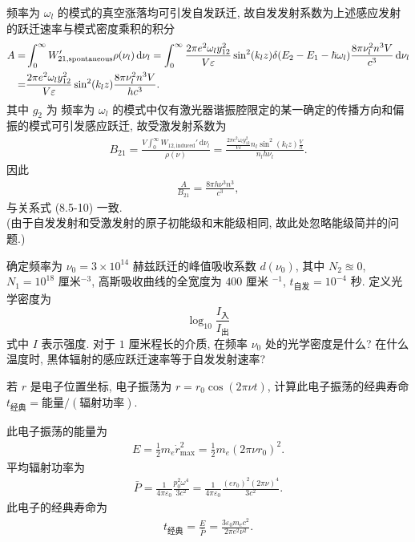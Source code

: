 \documentclass{note}
\begin{document}
\begin{pf}
    频率为 $\omega_l$ 的模式的真空涨落均可引发自发跃迁, 故自发发射系数为上述感应发射的跃迁速率与模式密度乘积的积分
    \begin{align}
        \notag A=&\int_0^{\infty}W_{21,\text{spontaneous}}'\rho(\nu_l)\,\mathrm{d}\nu_l=\int_0^{\infty}\frac{2\pi e^2\omega_ly_{12}^2}{V\varepsilon}\sin^2(k_lz)\delta(E_2-E_1-\hbar\omega_l)\frac{8\pi\nu_l^2n^3V}{c^3}\,\mathrm{d}\nu_l\\
        =&\frac{2\pi e^2\omega_ly_{12}^2}{V\varepsilon}\sin^2(k_lz)\frac{8\pi\nu_l^2n^3V}{hc^3}.
    \end{align}
    其中 $g_2$ 为
    频率为 $\omega_l$ 的模式中仅有激光器谐振腔限定的某一确定的传播方向和偏振的模式可引发感应跃迁, 故受激发射系数为
    \begin{align}
        B_{21}=\frac{V\int_0^{\infty}W_{12,\text{induced}}'\,\mathrm{d}\nu_l}{\rho(\nu)}=\frac{\frac{2\pi e^2\omega_ly_{12}^2}{V\varepsilon}n_l\sin^2(k_lz)\frac{V}{h}}{n_lh\nu_l}.
    \end{align}
    因此
    \begin{align}
        \frac{A}{B_{21}}=\frac{8\pi h\nu^3n^3}{c^3},
    \end{align}
    与关系式 (8.5-10) 一致.\\
    (由于自发发射和受激发射的原子初能级和末能级相同, 故此处忽略能级简并的问题.)
\end{pf}

\begin{exe}
    确定频率为 $\nu_0=3\times 10^{14}$ 赫兹跃迁的峰值吸收系数 $d(\nu_0)$, 其中 $N_2\approxeq 0$, $N_1=10^{18}$ 厘米${}^{-3}$, 高斯吸收曲线的全宽度为 $400$ 厘米 ${}^{-1}$, $t_{\text{自发}}=10^{-4}$ 秒. 定义光学密度为
    \[
        \log_{10}\frac{I_{\text{入}}}{I_{\text{出}}}
    \]
    式中 $I$ 表示强度. 对于 $1$ 厘米程长的介质, 在频率 $\nu_0$ 处的光学密度是什么? 在什么温度时, 黑体辐射的感应跃迁速率等于自发发射速率?
\end{exe}
\begin{sol}
    
\end{sol}

\begin{exe}
    若 $r$ 是电子位置坐标, 电子振荡为 $r=r_0\cos(2\pi\nu t)$, 计算此电子振荡的经典寿命 $t_{\text{经典}}=\text{能量}/(\text{辐射功率})$.
\end{exe}
\begin{sol}
    此电子振荡的能量为
    \begin{align}
        E=\frac{1}{2}m_e\dot{r}_{\max}^2=\frac{1}{2}m_e(2\pi\nu r_0)^2.
    \end{align}
    平均辐射功率为
    \begin{align}
        \bar{P}=\frac{1}{4\pi\varepsilon_0}\frac{p_0^2\omega^4}{3c^2}=\frac{1}{4\pi\varepsilon_0}\frac{(er_0)^2(2\pi\nu)^4}{3c^2}.
    \end{align}
    此电子的经典寿命为
    \begin{align}
        t_{\text{经典}}=\frac{E}{\bar{P}}=\frac{3\varepsilon_0m_ec^2}{2\pi e^2\nu^2}.
    \end{align}
\end{sol}
\end{document}
